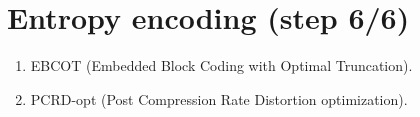\begin{comment}
\section*{Algoritmo b'asico de codificaci'on progresivo}
\begin{itemize}
\item Una forma de construir un compresor eficiente para el dominio
  Wavelet consiste en indicar d'onde se encuentran los \textsl{zero-trees}
  usando un n'umero de bits m'inimo:
\begin{enumerate}
\item Calcular la representaci'on signo-magnitud de los coeficientes.
\item Enviar el 'indice del plano de bits $p$ m'as significativo.
\item Codificar el plano de bits $p$ usando \textsl{zero-trees},
  emitiendo los signos de los coeficientes significativos.
\item Mientras $p>0$:
    \begin{enumerate}
    \item $p\leftarrow p-1$.
    \item Codificar el plano de bits $p$ usando \textsl{zero-trees},
      pero s'olo tener en cuenta aquellos coeficientes que todav'ia no
      son significativos. Emitir sus signos.
    \item Refinar el bit de peso $p$ de aquellos coeficientes que eran
      significativos en planos superiores.
    \end{enumerate}
\end{enumerate}
\item Por desgracia este algoritmo posee un defecto: el descompresor
  necesita almacenar en memoria toda la imagen (en formato
  ``wavelet'') para poder descomprimirla. Esto, si la imagen es muy
  grande es un grave inconveniente.
\end{itemize}
\end{comment}

\section{Entropy encoding (step 6/6)}
\label{J2K-codificacion-entropica}
\begin{enumerate}
\item EBCOT (Embedded Block Coding with Optimal Truncation).
\item PCRD-opt (Post Compression Rate Distortion optimization).
\end{enumerate}

